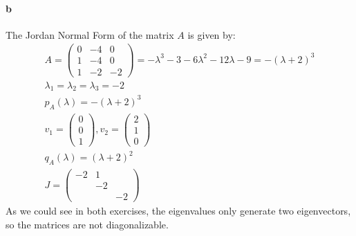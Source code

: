 \paragraph{b}
The Jordan Normal Form of the matrix $A$ is given by:
\begin{gather*}
A = \left( \begin{array}{ccc}
0 & -4 & 0 \\
1 & -4 & 0 \\
1 & -2 & -2 
\end{array} \right) = 
-\lambda^3 -3 -6 \lambda^2 - 12\lambda - 9  = -(\lambda+2)^3\\
\lambda_1 = \lambda_2 = \lambda_3 = -2\\
p_A(\lambda) = -(\lambda+2)^3 \\
v_1 = \left( \begin{array}{c}
0\\
0\\
1
\end{array} \right),
v_2 = \left( \begin{array}{c}
2\\
1\\
0
\end{array} \right)\\
q_A(\lambda) = \left( \lambda+2\right)^2\\
J = \left( \begin{array}{ccc} 
-2&1 &\\
& -2 &\\
& & -2
\end{array} \right)
\end{gather*}
As we could see in both exercises, the eigenvalues only generate two eigenvectors, so the matrices are not diagonalizable.

